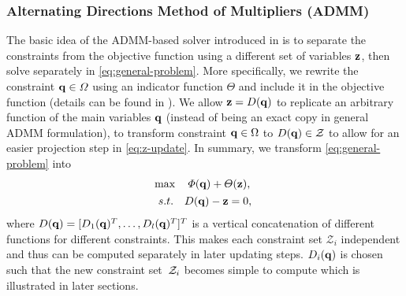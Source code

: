 \documentclass[10pt,twocolumn,twoside]{IEEEtran}
\def\sZ{\mathcal{Z}}
\begin{document}
\subsubsection{Alternating Directions Method of Multipliers (ADMM)}\label{chapter:ADMM review}
The basic idea of the ADMM-based solver introduced in \cite{yang2020multi} is to separate the constraints from the objective function using a different set of variables $\mathbf{z}$, then solve separately in \eqref{eq:general-problem}.
More specifically, we rewrite the constraint $\mathbf{q}\in\varOmega$ using an indicator function $\varTheta$ and include it in the objective function (details can be found in \cite{yang2020multi}). 
We allow $\mathbf{z} = D(\mathbf{q})$ to replicate an arbitrary function of the main variables $\mathbf{q}$ (instead of being an exact copy in general ADMM formulation), to transform constraint $\mathbf{q}\in\Omega$ to $D(\vq) \in \sZ$ to allow for an easier projection step in \cref{eq:z-update}. In summary, we transform \cref{eq:general-problem} into
\begin{equation}\label{eq:ADMMSetConstraint_modified}
	\begin{aligned}
		&\max\quad \varPhi(\vq)+\varTheta(\vz), \\
		& \begin{array}{r@{\quad}c}
			s.t.& D(\vq)-\vz=0,
		\end{array} 
	\end{aligned}
\end{equation}
where $D(\mathbf{q})= [D_1(\mathbf{q})^T,\dots,D_l(\mathbf{q})^T]^T$ is a vertical concatenation of different functions for different constraints. This makes each constraint set $\mathcal{Z}_i$ independent and thus can be computed separately in later updating steps. $D_i(\mathbf{q})$ is chosen such that the new constraint set~$\mathcal{Z}_i$ becomes simple to compute which is illustrated in later sections. %
\end{document}
